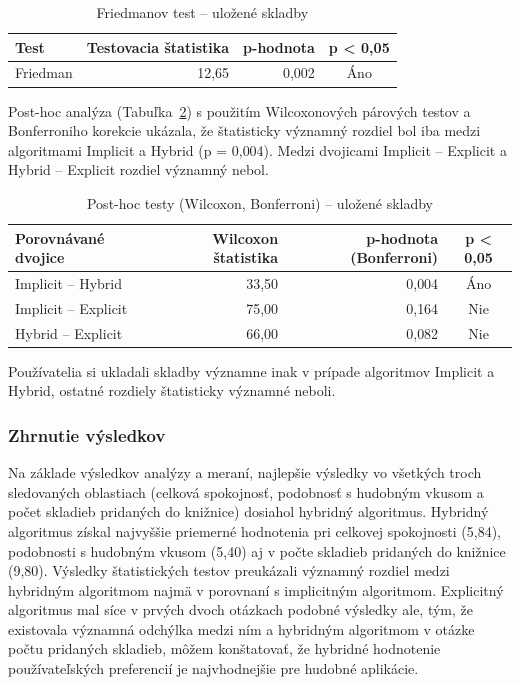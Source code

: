 \begin{table}[h!]
  \caption{Friedmanov test – uložené skladby}
  \label{tab:friedman_uloz}
  \centering
  \begin{tabular}{@{}lrrc@{}}
    \toprule
    \textbf{Test} & \textbf{Testovacia štatistika} & \textbf{p-hodnota} & \textbf{p < 0{,}05} \\
    \midrule
    Friedman & 12{,}65 & 0{,}002 & Áno \\
    \bottomrule
  \end{tabular}
\end{table}

Post-hoc analýza (Tabuľka~\ref{tab:posthoc_uloz}) s použitím Wilcoxonových párových testov a Bonferroniho korekcie ukázala, že štatisticky významný rozdiel bol iba medzi algoritmami Implicit a Hybrid (p = 0{,}004).
Medzi dvojicami Implicit – Explicit a Hybrid – Explicit rozdiel významný nebol.
    
\begin{table}[h!]
  \caption{Post-hoc testy (Wilcoxon, Bonferroni) – uložené skladby}
  \label{tab:posthoc_uloz}
  \centering
  \begin{tabular}{@{}lrrc@{}}
    \toprule
    \textbf{Porovnávané dvojice} & \textbf{Wilcoxon štatistika} & \textbf{p-hodnota (Bonferroni)} & \textbf{p < 0{,}05} \\
    \midrule
    Implicit -- Hybrid & 33{,}50 & 0{,}004 & Áno \\
    Implicit -- Explicit & 75{,}00 & 0{,}164 & Nie \\
    Hybrid -- Explicit & 66{,}00 & 0{,}082 & Nie \\
    \bottomrule
  \end{tabular}
\end{table}

Používatelia si ukladali skladby významne inak v prípade algoritmov Implicit a Hybrid, ostatné rozdiely štatisticky významné neboli.


\subsubsection{Zhrnutie výsledkov}
Na základe výsledkov analýzy a meraní, najlepšie výsledky vo všetkých troch sledovaných oblastiach (celková spokojnosť, podobnosť s hudobným vkusom a počet skladieb pridaných do knižnice) dosiahol hybridný algoritmus. Hybridný algoritmus získal najvyššie priemerné hodnotenia pri celkovej spokojnosti (5,84), podobnosti s hudobným vkusom (5,40) aj v počte skladieb pridaných do knižnice (9,80). Výsledky štatistických testov preukázali významný rozdiel medzi hybridným algoritmom najmä v porovnaní s implicitným algoritmom. Explicitný algoritmus mal síce v prvých dvoch otázkach podobné výsledky ale, tým, že existovala významná odchýlka medzi ním a hybridným algoritmom v otázke počtu pridaných skladieb, môžem konštatovať, že hybridné hodnotenie používateľských preferencií je najvhodnejšie pre hudobné aplikácie.

